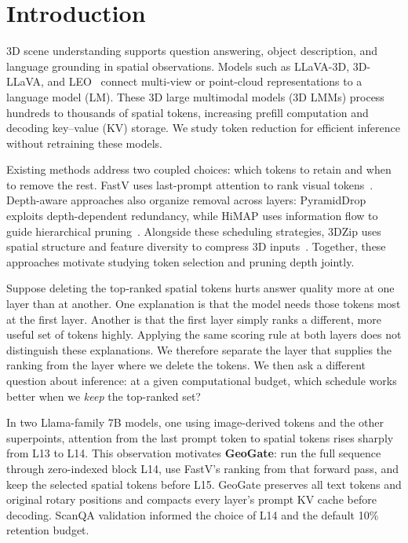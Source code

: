 \section{Introduction}
3D scene understanding supports question answering, object description, and language grounding in spatial observations. Models such as LLaVA-3D, 3D-LLaVA, and LEO~\citep{zhu2024llava3d,deng20253dllava,huang2024leo} connect multi-view or point-cloud representations to a language model (LM). These 3D large multimodal models (3D LMMs) process hundreds to thousands of spatial tokens, increasing prefill computation and decoding key--value (KV) storage. We study token reduction for efficient inference without retraining these models.

Existing methods address two coupled choices: which tokens to retain and when to remove the rest. FastV uses last-prompt attention to rank visual tokens~\citep{chen2024fastv}. Depth-aware approaches also organize removal across layers: PyramidDrop exploits depth-dependent redundancy, while HiMAP uses information flow to guide hierarchical pruning~\citep{yuan2024pyramiddrop,yin2025himap}. Alongside these scheduling strategies, 3DZip uses spatial structure and feature diversity to compress 3D inputs~\citep{baek2026zip}. Together, these approaches motivate studying token selection and pruning depth jointly.

Suppose deleting the top-ranked spatial tokens hurts answer quality more at one layer than at another. One explanation is that the model needs those tokens most at the first layer. Another is that the first layer simply ranks a different, more useful set of tokens highly. Applying the same scoring rule at both layers does not distinguish these explanations. We therefore separate the layer that supplies the ranking from the layer where we delete the tokens. We then ask a different question about inference: at a given computational budget, which schedule works better when we \emph{keep} the top-ranked set?

In two Llama-family 7B models, one using image-derived tokens and the other superpoints, attention from the last prompt token to spatial tokens rises sharply from L13 to L14. This observation motivates \textbf{GeoGate}: run the full sequence through zero-indexed block L14, use FastV's ranking from that forward pass, and keep the selected spatial tokens before L15. GeoGate preserves all text tokens and original rotary positions and compacts every layer's prompt KV cache before decoding. ScanQA validation informed the choice of L14 and the default 10\% retention budget.

